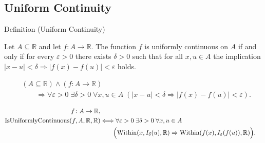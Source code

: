 
\subsection*{Uniform Continuity}
\label{sec:uniform-continuity}

\begin{definitionbox}{Definition (Uniform Continuity)}
\begin{definition}
\label{def:uniform-continuity}
Let $A \subseteq \mathbb{R}$ and let $f:A \to \mathbb{R}$. The function $f$ is uniformly continuous on $A$ if and only if for every $\varepsilon > 0$ there exists $\delta > 0$ such that for all $x,u \in A$ the implication $|x-u| < \delta \Rightarrow |f(x)-f(u)| < \varepsilon$ holds.
\end{definition}
\end{definitionbox}

\begin{remark*}
\[
\begin{aligned}
&(A\subseteq\mathbb{R})\land(f:A\to\mathbb{R})\\
&\qquad\Longrightarrow
\forall \varepsilon > 0 \; \exists \delta > 0 \; \forall x,u \in A \; (|x-u| < \delta \Rightarrow |f(x)-f(u)| < \varepsilon).
\end{aligned}
\]
\end{remark*}

\begin{remark*}
\[
\begin{aligned}
  f\colon A\to\mathbb{R},\\
\operatorname{IsUniformlyContinuous}(f,A,\mathbb R,\mathbb R)
&\Longleftrightarrow
\forall \varepsilon > 0 \; \exists \delta > 0 \; \forall x,u \in A\\
&\qquad
\Bigl(
  \operatorname{Within}(x,I_\delta(u),\mathbb R)
  \Rightarrow
  \operatorname{Within}(f(x),I_\varepsilon(f(u)),\mathbb R)
\Bigr).
\end{aligned}
\]
\end{remark*}

